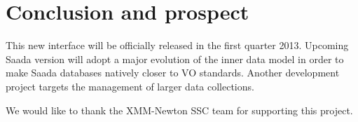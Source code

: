 \section {Conclusion and prospect}
This new interface will be officially released in the first quarter 2013.
Upcoming Saada version will adopt a major evolution of the inner data model in order to make Saada databases natively closer to VO standards. Another development project targets the management of larger data collections.

\acknowledgements We would like to thank the XMM-Newton SSC team for supporting this project.



